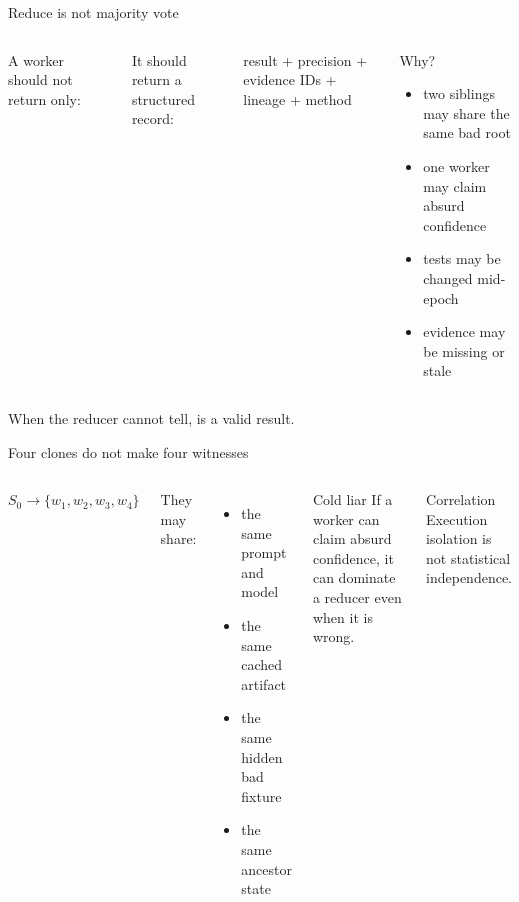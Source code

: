 \begin{frame}{Reduce is not majority vote}
\small
\begin{columns}[T,onlytextwidth]
A worker should not return only:
\begin{center}
\Large {}
\end{center}
It should return a structured record:
\begin{center}
\normalsize result + precision + evidence IDs + lineage + method
\end{center}
\begin{block}{Why?}
\begin{itemize}
  \item two siblings may share the same bad root
  \item one worker may claim absurd confidence
  \item tests may be changed mid-epoch
  \item evidence may be missing or stale
\end{itemize}
\end{block}
\end{columns}
\vspace{0.6em}
\centering\large When the reducer cannot tell,  is a valid result.
\end{frame}

\begin{frame}{Four clones do not make four witnesses}
\begin{columns}[T,onlytextwidth]
\Large
\begin{center}
$S_0 \rightarrow \{w_1,w_2,w_3,w_4\}$
\end{center}
\normalsize They may share:
\begin{itemize}
  \item the same prompt and model
  \item the same cached artifact
  \item the same hidden bad fixture
  \item the same ancestor state
\end{itemize}
\begin{block}{Cold liar}
If a worker can claim absurd confidence, it can dominate a reducer even when it is wrong.
\end{block}
\vspace{0.6em}
\begin{block}{Correlation}
Execution isolation is not statistical independence.
\end{block}
\end{columns}
\vspace{0.5em}
\centering\Large {}
\end{frame}
